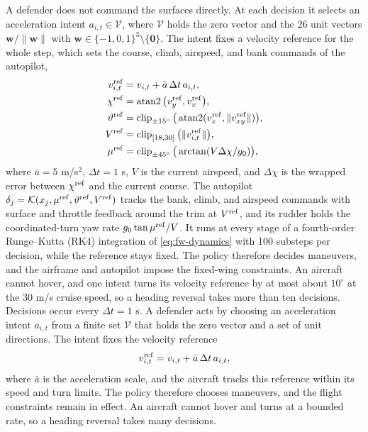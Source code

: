 A defender does not command the surfaces directly. At each decision it selects an acceleration intent $a_{i,t}\in\mathcal V$, where $\mathcal V$ holds the zero vector and the 26 unit vectors $\mathbf w/\|\mathbf w\|$ with $\mathbf w\in\{-1,0,1\}^3\setminus\{\mathbf 0\}$. The intent fixes a velocity reference for the whole step, which sets the course, climb, airspeed, and bank commands of the autopilot,
\begin{equation}
\begin{aligned}
v^{\rm ref}_{i,t}&=v_{i,t}+\bar a\,\Delta t\,a_{i,t},\\
\chi^{\rm ref}&=\operatorname{atan2}\big(v^{\rm ref}_y,v^{\rm ref}_x\big),\\
\vartheta^{\rm ref}&=\operatorname{clip}_{\pm15^\circ}\big(\operatorname{atan2}(v^{\rm ref}_z,\|v^{\rm ref}_{xy}\|)\big),\\
V^{\rm ref}&=\operatorname{clip}_{[18,30]}\big(\|v^{\rm ref}_{i,t}\|\big),\\
\mu^{\rm ref}&=\operatorname{clip}_{\pm45^\circ}\big(\arctan(V\Delta\chi/g_0)\big),
\end{aligned}
\label{eq:fw-reference}
\end{equation}
where $\bar a=5$ m/s$^2$, $\Delta t=1$ s, $V$ is the current airspeed, and $\Delta\chi$ is the wrapped error between $\chi^{\rm ref}$ and the current course. The autopilot $\delta_j=\mathcal K(x_j,\mu^{\rm ref},\vartheta^{\rm ref},V^{\rm ref})$ tracks the bank, climb, and airspeed commands with surface and throttle feedback around the trim at $V^{\rm ref}$, and its rudder holds the coordinated-turn yaw rate $g_0\tan\mu^{\rm ref}/V$. It runs at every stage of a fourth-order Runge--Kutta (RK4) integration of \eqref{eq:fw-dynamics} with 100 substeps per decision, while the reference stays fixed. The policy therefore decides maneuvers, and the airframe and autopilot impose the fixed-wing constraints. An aircraft cannot hover, and one intent turns its velocity reference by at most about $10^\circ$ at the 30 m/s cruise speed, so a heading reversal takes more than ten decisions.
\else
Decisions occur every $\Delta t=1$ s. A defender acts by choosing an acceleration intent $a_{i,t}$ from a finite set $\mathcal V$ that holds the zero vector and a set of unit directions. The intent fixes the velocity reference
\begin{equation}
v^{\rm ref}_{i,t}=v_{i,t}+\bar a\,\Delta t\,a_{i,t},
\label{eq:fw-reference}
\end{equation}
where $\bar a$ is the acceleration scale, and the aircraft tracks this reference within its speed and turn limits. The policy therefore chooses maneuvers, and the flight constraints remain in effect. An aircraft cannot hover and turns at a bounded rate, so a heading reversal takes many decisions.
\fi

